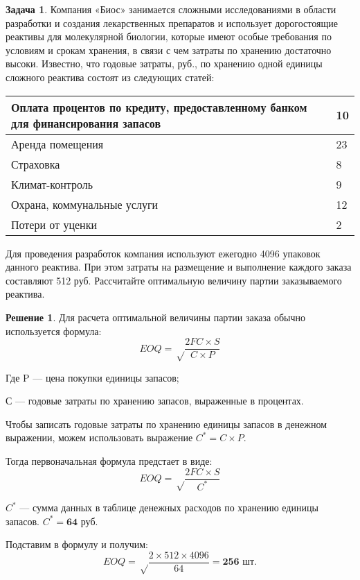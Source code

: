 \documentclass[a4paper, 14pt]{article}
\theoremstyle{plain} %
\theoremstyle{definition} %
\newtheorem*{solution}{Решение}
\newtheorem{problem}{Задача}[subsection]
\theoremstyle{remark} %
\begin{document}
\begin{problem}
	Компания «Биос» занимается сложными исследованиями в области разработки и создания лекарственных препаратов и использует дорогостоящие реактивы для молекулярной биологии, которые имеют особые требования по условиям и срокам хранения, в связи с чем затраты по хранению достаточно высоки. Известно, что годовые затраты, руб., по хранению одной единицы сложного реактива состоят из следующих статей:
\begin{center}
\begin{tabular}{|p{11.4cm}|l|}
\hline
Оплата процентов по кредиту, предоставленному банком для финансирования запасов & 10  \\
\hline
Аренда помещения                                                                & 23  \\
\hline
Страховка                                                                       & 8   \\
\hline
Климат-контроль                                                                 & 9   \\
\hline
Охрана, коммунальные услуги                                                     & 12  \\
\hline
Потери от уценки                                                                & 2   \\
\hline
\end{tabular}
\end{center}

Для  проведения  разработок  компания  используют  ежегодно  4096  упаковок  данного реактива. При этом затраты на размещение и выполнение каждого заказа составляют 512 руб. Рассчитайте оптимальную величину партии заказываемого реактива.
	\begin{solution}
		Для расчета оптимальной величины партии заказа обычно используется формула:
		\[EOQ = \sqrt \frac{2FC \times S}{C\times P}\]

		Где P --- цена покупки единицы запасов;

		С --- годовые затраты по хранению запасов, выраженные в процентах.

		Чтобы записать годовые затраты по хранению единицы запасов в денежном выражении, можем использовать выражение $C^{*} = C\times P$.

		Тогда первоначальная формула предстает в виде:
		\[EOQ = \sqrt \frac{2FC \times S}{C^{*}}\]

		$C^{*}$ --- сумма данных в таблице денежных расходов по хранению единицы запасов. $C^{*} = \textbf{64 руб.}$

		Подставим в формулу и получим:
		\[EOQ = \sqrt \frac{2 \times 512 \times 4096}{64} = \textbf{256 шт.}\]
	\end{solution}
\end{problem}
\end{document}
